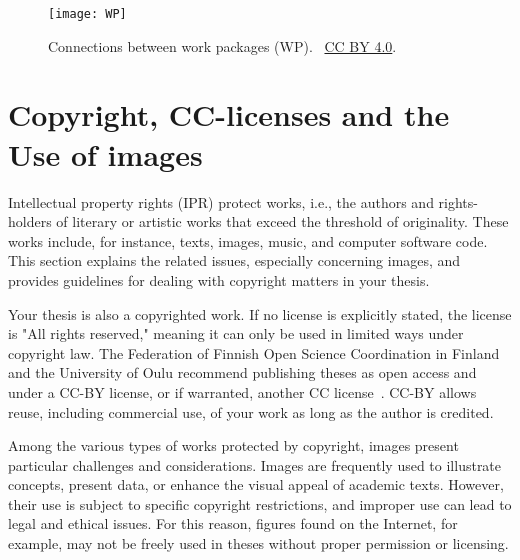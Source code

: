 \begin{figure}[ht]
  \begin{center}
    \texttt{[image: WP]}
  \end{center}
  \caption{Connections between work packages (WP). \copyrightstring\ \href{https://creativecommons.org/licenses/by/4.0/}{CC BY 4.0}.}
  \label{fig:work_packages}
\end{figure}

\section{Copyright, CC-licenses and the Use of images}
\label{copyright}
Intellectual property rights (IPR) protect works, i.e., the authors
and rights-holders of literary or artistic works that exceed the
threshold of originality. These works include, for instance, texts,
images, music, and computer software code. This section explains the
related issues, especially concerning images, and provides guidelines
for dealing with copyright matters in your thesis.

Your thesis is also a copyrighted work. If no license is explicitly
stated, the license is "All rights reserved," meaning it can only be
used in limited ways under copyright law. The Federation of Finnish
Open Science Coordination in Finland and the University of Oulu
recommend publishing theses as open access and under a CC-BY license,
or if warranted, another CC license~\cite{coordination_open_2024}.
CC-BY allows reuse, including commercial use, of your work as long as
the author is credited.

Among the various types of works protected by copyright, images present particular challenges and considerations. Images are frequently used to illustrate concepts, present data, or enhance the visual appeal of academic texts. However, their use is subject to specific copyright restrictions, and improper use can lead to legal and ethical issues.
For this reason, figures found on the Internet, for example, may not be freely used in theses without proper permission or licensing. 

